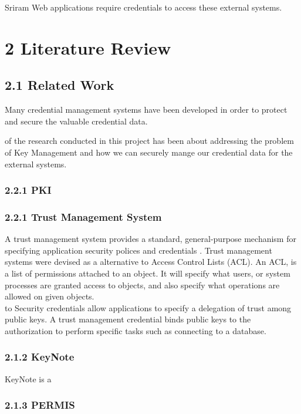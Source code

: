 \documentclass[11pt, a4paper, twoside, openright, notitlepage]{report}
\begin{document}
Sriram
Web applications require credentials to access these external systems.  








\section*{2 Literature Review}
\subsection*{2.1 Related Work}
Many credential management systems have been developed in order to protect and secure the valuable credential data. 


 of the research conducted in this project has been about addressing the problem of Key Management and how we can securely mange our credential data for the external systems. 


\subsubsection*{2.2.1 PKI}
\subsubsection*{2.2.1 Trust Management System}
A trust management system provides a standard, general-purpose mechanism for specifying application security polices and credentials  \cite{blaze1999keynote}. Trust management systems were devised as a alternative to Access Control Lists (ACL). An ACL, is a list of permissions attached to an object. It will specify what users, or system processes are granted access to objects, and also specify what operations are allowed on given objects. \cite{acl-rfc} \\



 to Security credentials allow applications to specify a delegation of trust among public keys. A trust management credential binds public keys to the authorization to perform specific tasks such as connecting to a database. \cite{blaze1999keynote}
\subsubsection*{2.1.2 KeyNote}
KeyNote is a 
\subsubsection*{2.1.3 PERMIS}
\end{document}
